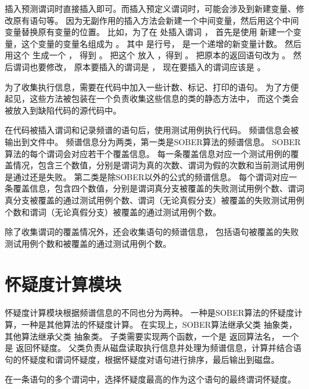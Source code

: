 插入预测谓词时直接插入即可。而插入预定义谓词时，可能会涉及到新建变量、修改原有语句等。
因为无副作用的插入方法会新建一个中间变量，然后用这个中间变量替换原有变量的位置。
比如，为了在  处插入谓词 ，
首先是使用  新建一个变量，这个变量的变量名组成为
。
其中  是行号，  是一个递增的新变量计数。
然后用这个  生成一个  ，
得到 。
把这个  放入 ，得到 。
把原本的返回语句改为 。
然后谓词也要修改，
原本要插入的谓词是 ，
现在要插入的谓词应该是 。

为了收集执行信息，需要在代码中加入一些计数、标记、打印的语句。
为了方便起见，这些方法被包装在一个负责收集这些信息的类的静态方法中，
而这个类会被放入到缺陷代码的源代码中。

在代码被插入谓词和记录频谱的语句后，使用测试用例执行代码。
频谱信息会被输出到文件中。
频谱信息分为两类，第一类是SOBER算法的频谱信息。
SOBER算法的每个谓词会对应若干个覆盖信息。
每一条覆盖信息对应一个测试用例的覆盖情况，包含三个数值，分别是谓词为真的次数、谓词为假的次数和当前测试用例是通过还是失败。
第二类是除SOBER以外的公式的频谱信息。
每个谓词对应一条覆盖信息，包含四个数值，分别是谓词真分支被覆盖的失败测试用例个数、谓词真分支被覆盖的通过测试用例个数、谓词（无论真假分支）被覆盖的失败测试用例个数和谓词（无论真假分支）被覆盖的通过测试用例个数。

除了收集谓词的覆盖情况外，还会收集语句的频谱信息，
包括语句被覆盖的失败测试用例个数和被覆盖的通过测试用例个数。

\section{怀疑度计算模块}

怀疑度计算模块根据频谱信息的不同也分为两种。
一种是SOBER算法的怀疑度计算，一种是其他算法的怀疑度计算。
在实现上，SOBER算法继承父类  抽象类，
其他算法继承父类  抽象类。
子类需要实现两个函数，一个是  返回算法名，
一个是  返回怀疑度。
父类负责从磁盘读取执行信息并处理为频谱信息，计算并结合语句的怀疑度和谓词怀疑度，根据怀疑度对语句进行排序，最后输出到磁盘。

在一条语句的多个谓词中，选择怀疑度最高的作为这个语句的最终谓词怀疑度。


